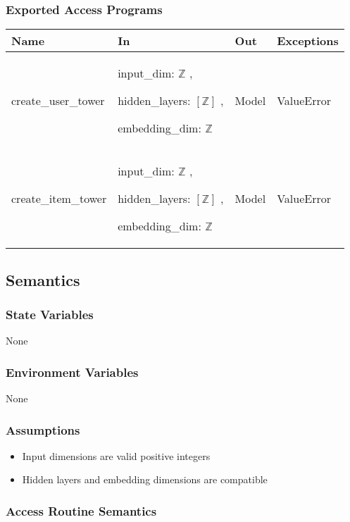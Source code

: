 \documentclass[12pt, titlepage]{article}
\begin{document}
\subsubsection{Exported Access Programs}

\begin{center}
  \begin{tabular}{p{4cm} p{4cm} p{4cm} p{2cm}}
  \hline
  \textbf{Name} & \textbf{In} & \textbf{Out} & \textbf{Exceptions} \\
  \hline
  create\_user\_tower & input\_dim: $\mathbb{Z}$ ,
  
  hidden\_layers: $[\mathbb{Z}]$ ,
  
  embedding\_dim: $\mathbb{Z}$ &  Model & ValueError \\
  \hline
  create\_item\_tower & input\_dim: $\mathbb{Z}$ ,
  
  hidden\_layers: $[\mathbb{Z}]$ ,
  
  embedding\_dim: $\mathbb{Z}$ &  Model & ValueError \\
  \hline
  \end{tabular}
  \end{center}

\subsection{Semantics}

\subsubsection{State Variables}
None

\subsubsection{Environment Variables}

None

\subsubsection{Assumptions}

\begin{itemize}
  \item Input dimensions are valid positive integers
  \item Hidden layers and embedding dimensions are compatible
\end{itemize}

\subsubsection{Access Routine Semantics}
\end{document}
